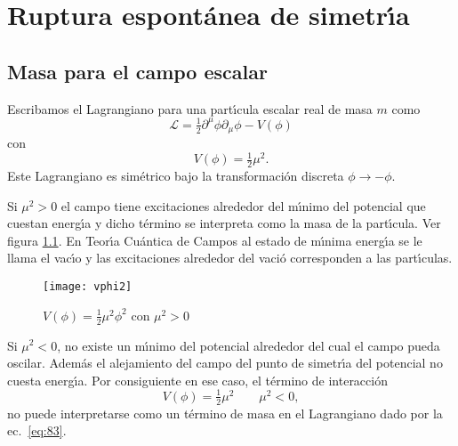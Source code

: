 \chapter{Ruptura espont\'anea de simetr\'\i a}
\label{rupt-espont-de} %


\section{Masa para el campo escalar}
\label{sec:masa-para-el}

Escribamos el Lagrangiano para una part\'\i cula escalar real de masa $m$ como
\begin{equation}
\label{eq:83}
\mathcal{L}=\tfrac{1}{2}\partial^\mu\phi\partial_\mu\phi-V(\phi)
\end{equation}
con
\begin{equation}
  V(\phi)=\tfrac{1}{2}\mu^2.
\end{equation}
Este Lagrangiano es sim\'etrico bajo la transformaci\'on discreta $\phi\to-\phi$. 

Si $\mu^2\gt 0$ el campo tiene excitaciones alrededor del m\'\i nimo del potencial que cuestan energ\'\i a y dicho t\'ermino se interpreta como la masa de la part\'\i cula. Ver figura \ref{fig:x2}. En Teor\'\i a Cu\'antica de Campos al estado de m\'\i nima energ\'\i a se le llama el vac\'\i o y las excitaciones alrededor del vaci\'o corresponden a las part\'\i culas.
\begin{figure} %
  \centering %
  \texttt{[image: vphi2]}
  \caption{$V(\phi)=\frac{1}{2}\mu^2 \phi^2$ con $\mu^2\gt 0$} %
  \label{fig:x2} %
\end{figure} %

Si $\mu^2\lt 0$, no existe un m\'\i nimo del potencial alrededor del cual el campo pueda oscilar. Adem\'as el alejamiento del campo del punto de simetr\'\i a del potencial no cuesta energ\'\i a. Por consiguiente en ese caso, el t\'ermino de interacci\'on
\begin{equation}
  V(\phi)=\tfrac{1}{2}\mu^2   \qquad 
  \mu^2\lt 0,
\end{equation}
no puede interpretarse como un t\'ermino de masa en el Lagrangiano dado por la ec.~\eqref{eq:83}. 

